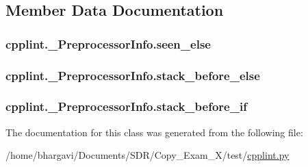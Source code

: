 \subsection{Member Data Documentation}
\subsubsection[{\texorpdfstring{seen\+\_\+else}{seen_else}}]{\setlength{\rightskip}{0pt plus 5cm}cpplint.\+\_\+\+Preprocessor\+Info.\+seen\+\_\+else}\hypertarget{classcpplint_1_1___preprocessor_info_a7587e84a1e6db34c3c94317f5a5931cc}{}\label{classcpplint_1_1___preprocessor_info_a7587e84a1e6db34c3c94317f5a5931cc}
\subsubsection[{\texorpdfstring{stack\+\_\+before\+\_\+else}{stack_before_else}}]{\setlength{\rightskip}{0pt plus 5cm}cpplint.\+\_\+\+Preprocessor\+Info.\+stack\+\_\+before\+\_\+else}\hypertarget{classcpplint_1_1___preprocessor_info_a34a80f1f97808614b7062ba1e5bbf2b9}{}\label{classcpplint_1_1___preprocessor_info_a34a80f1f97808614b7062ba1e5bbf2b9}
\subsubsection[{\texorpdfstring{stack\+\_\+before\+\_\+if}{stack_before_if}}]{\setlength{\rightskip}{0pt plus 5cm}cpplint.\+\_\+\+Preprocessor\+Info.\+stack\+\_\+before\+\_\+if}\hypertarget{classcpplint_1_1___preprocessor_info_a0681b2adca3171a495fc1eca43d245c0}{}\label{classcpplint_1_1___preprocessor_info_a0681b2adca3171a495fc1eca43d245c0}


The documentation for this class was generated from the following file\+:\begin{DoxyCompactItemize}
\item 
/home/bhargavi/\+Documents/\+S\+D\+R/\+Copy\+\_\+\+Exam\+\_\+X/test/\hyperlink{cpplint_8py}{cpplint.\+py}\end{DoxyCompactItemize}
